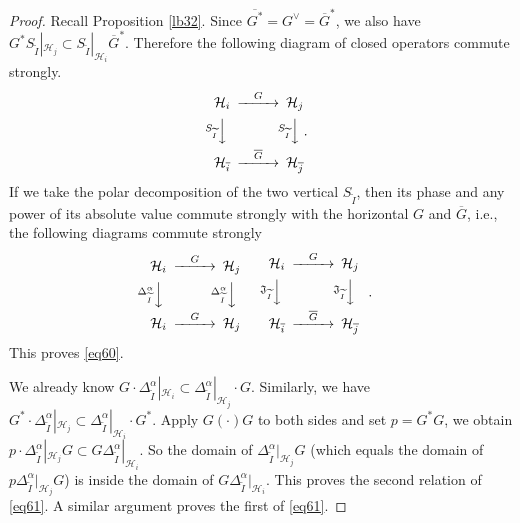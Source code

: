 \documentclass[12pt,a4paper]{article}
\theoremstyle{definition}
\theoremstyle{plain}
\newcommand{\fk}{\mathfrak}
\newcommand{\mc}{\mathcal}
\newcommand{\wtd}{\widetilde}
\newcommand{\ovl}{\overline}
\numberwithin{equation}{section}
\begin{document}
\begin{proof}
Recall Proposition \ref{lb32}. Since $\ovl{G^*}=G^\vee={\ovl G}^*$, we also have $G^*S_{\wtd I}|_{\mc H_j}\subset S_{\wtd I}|_{\mc H_i}{\ovl G}^*$. Therefore the following diagram of closed operators commute strongly.
	\begin{align}
		\begin{CD}
			\mc H_i @>G>> \mc H_j\\
			@V S_{\wtd I} VV @V S_{\wtd I} VV\\
			\mc H_{\ovl i} @>\ovl G>> \mc H_{\ovl j}
		\end{CD}.
	\end{align}
	If we take the polar decomposition of the two vertical $S_{\wtd I}$, then its phase and any power of its absolute value commute strongly with the horizontal $G$ and $\ovl G$, i.e., the following diagrams commute strongly
	\begin{align}
\begin{CD}
	\mc H_i @>G>> \mc H_j\\
	@V \Delta_{\wtd I}^\alpha VV @V \Delta_{\wtd I}^\alpha VV\\
	\mc H_i @>G>> \mc H_j
\end{CD}\qquad
		\begin{CD}
			\mc H_i @>G>> \mc H_j\\
			@V \fk J_{\wtd I} VV @V \fk J_{\wtd I} VV\\
			\mc H_{\ovl i} @>\ovl G>> \mc H_{\ovl j}
		\end{CD}~~.
	\end{align}
This proves \eqref{eq60}.

We already know $G\cdot \Delta_{\wtd I}^\alpha|_{\mc H_i}\subset\Delta_{\wtd I}^\alpha|_{\mc H_j}\cdot G$. Similarly, we have $G^*\cdot \Delta_{\wtd I}^\alpha|_{\mc H_j}\subset\Delta_{\wtd I}^\alpha|_{\mc H_i}\cdot G^*$. Apply $G(\cdot)G$ to both sides and set $p=G^*G$, we obtain $p\cdot \Delta_{\wtd I}^\alpha|_{\mc H_j} G\subset G\Delta_{\wtd I}^\alpha|_{\mc H_i}$. So the domain of $\Delta_{\wtd I}^\alpha|_{\mc H_j} G$ (which equals the domain of $p\Delta_{\wtd I}^\alpha|_{\mc H_j} G$) is inside the domain of $G\Delta_{\wtd I}^\alpha|_{\mc H_i}$. This proves the second relation of \eqref{eq61}. A similar argument proves the first of \eqref{eq61}. 
\end{proof}
\end{document}
